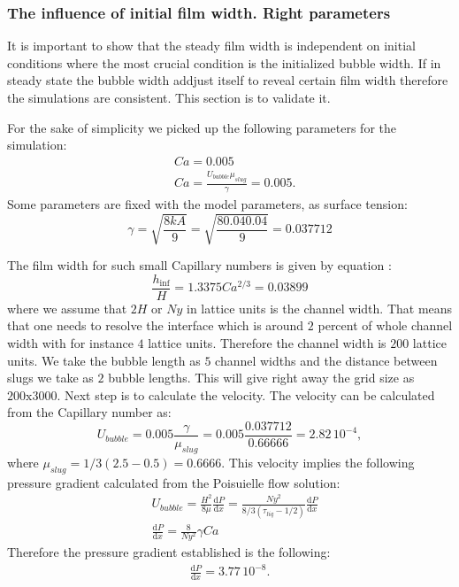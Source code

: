 \documentclass{article}
\begin{document}
\subsubsection{The influence of initial film width. Right parameters}
It is important to show that the steady film width is independent on initial
conditions where the most crucial condition is the initialized bubble width. If
in steady state the bubble width addjust itself to reveal certain film width
therefore the simulations are consistent. This section is to validate it.
 
For the sake of simplicity we picked up the following parameters for the
simulation:
\begin{equation}
\begin{aligned}
&Ca=0.005\\
&Ca=\frac{U_{bubble} \mu_{slug}}{\gamma}=0.005.
\end{aligned}
\end{equation}
Some parameters are fixed with the model parameters, as surface tension:
\begin{equation}
\gamma=\sqrt{\frac{8 k A}{9}}=\sqrt{\frac{8 0.04 0.04}{9}}=0.037712
\end{equation}

The film width for such small Capillary numbers is given by equation
\cite{giavedoni-numerical}:
\begin{equation}
\frac{h_{\inf}}{H}=1.3375 Ca^{2/3}=0.03899
\end{equation}
where we assume that $2 H$ or $Ny$ in lattice units is the channel width. That
means that one needs to resolve the interface which is around $2$ percent of
whole channel width with for instance $4$ lattice units. Therefore the channel
width is $200$ lattice units. We take the bubble length as $5$ channel widths
and the distance between slugs we take as $2$ bubble lengths. This will give
right away the grid size as $200\mathrm{x}3000$. Next step is to calculate the
velocity. The velocity can be calculated from the Capillary number as:
\begin{equation}
U_{bubble}=0.005 \frac{\gamma}{\mu_{slug}}=0.005 \frac{0.037712}{0.66666}=2.82\,
10^{-4},
\end{equation}
where $\mu_{slug}=1/3 (2.5-0.5)=0.6666$.
This velocity implies the following pressure gradient calculated from the
Poisuielle flow solution:
\begin{equation}
\begin{aligned}
&U_{bubble}=\frac{H^2}{8\mu} \frac{\mathrm{d}P}{\mathrm{d}x}=\frac{Ny^2}{8/3
(\tau_{liq}-1/2)}\frac{\mathrm{d}P}{\mathrm{d}x}\\
&\frac{\mathrm{d}P}{\mathrm{d}x}=\frac{8}{Ny^2}\gamma Ca
\end{aligned}
\end{equation}
Therefore the pressure gradient established is the following:
\begin{equation}
\begin{aligned}
\frac{\mathrm{d}P}{\mathrm{d}x}=3.77\, 10^{-8}.
\end{aligned}
\end{equation}
\end{document}
